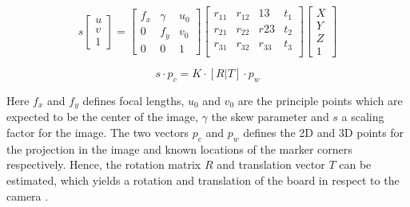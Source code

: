 \documentclass[../Head/report.tex]{subfiles}
\begin{document}
\begin{equation}
	s	
	\begin{bmatrix}
		u\\
		v\\
		1
	\end{bmatrix}
	=
	\begin{bmatrix}
		f_x & \gamma & u_0\\
		0 & f_y & v_0\\
		0 & 0 & 1
	\end{bmatrix}
	\begin{bmatrix}
		r_11 & r_12 & 13 & t_1\\
		r_21 & r_22 & r23 & t_2 \\
		r_31 & r_32 & r_33 & t_3 \\
	\end{bmatrix}
	\begin{bmatrix}
		X\\
		Y\\
		Z\\
		1
	\end{bmatrix}
	\label{eq:pnp}
\end{equation}

\begin{equation}
	s \cdot p_{c} = K \cdot[R|T] \cdot p_{w}
	\label{eq:pnp_simplified}
\end{equation}

Here $f_x$ and $f_y$ defines focal lengths, $u_0$ and $v_0$ are the principle points which are expected to be the center of the image, $\gamma$ the skew parameter and $s$ a scaling factor for the image. The two vectors $p_c$ and $p_w$ defines the 2D and 3D points for the projection in the image and known locations of the marker corners respectively. Hence, the rotation matrix $R$ and translation vector $T$ can be estimated, which yields a rotation and translation of the board in respect to the camera \cite{pnp} \cite{estimatePoseBoard}. 
\end{document}
